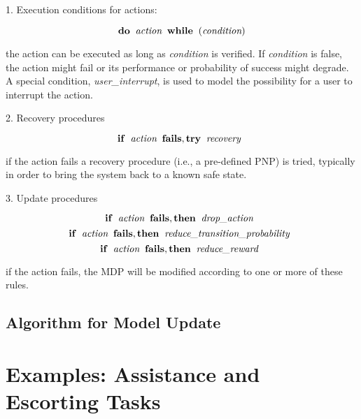 1. Execution conditions for actions:

\[ \mathbf{do} \;\; \emph{action} \;\; \mathbf{while} \;\; ( \emph{condition} ) \]

\noindent
the action can be executed as long as \emph{condition} is verified.
If \emph{condition} is false, the action might fail or its performance or probability of success might degrade.
A special condition, \emph{user\_interrupt}, is used to model the possibility for a user to interrupt the action.

\vspace{0.5cm}

2. Recovery procedures

\[ \mathbf{if} \;\; \emph{action} \;\; \mathbf{fails, try} \;\; \emph{recovery} \;\; \]

\noindent
if the action fails a recovery procedure (i.e., a pre-defined PNP) is tried, typically in order to bring the system back to a known safe state.


\vspace{0.5cm}

3. Update procedures

\[ \mathbf{if} \;\; \emph{action} \;\; \mathbf{fails, then} \;\; \emph{drop\_action} \;\; \]
\[ \mathbf{if} \;\; \emph{action} \;\; \mathbf{fails, then} \;\; \emph{reduce\_transition\_probability} \;\; \]
\[ \mathbf{if} \;\; \emph{action} \;\; \mathbf{fails, then} \;\; \emph{reduce\_reward} \;\; \]



\noindent
if the action fails, the MDP will be modified according to one or more of these rules.






\subsection{Algorithm for Model Update}


\section{Examples: Assistance and Escorting Tasks}



